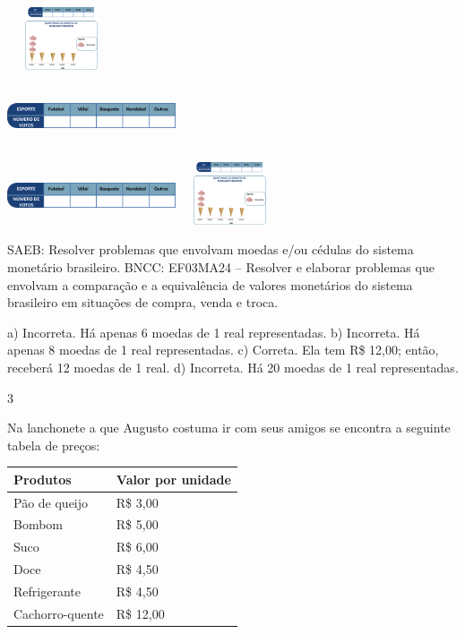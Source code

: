 \begin{escolha}
{\begin{escolha}
\begin{escolha}
\item
\includegraphics[width=1.26678in,height=0.72506in]{media/image84.png}

\item
\includegraphics[width=1.95850in,height=0.69173in]{media/image85.png}

\item
\includegraphics[width=1.95850in,height=0.69173in]{media/image85.png}\includegraphics[width=1.26678in,height=0.72506in]{media/image84.png}
\end{escolha}

SAEB: Resolver problemas que envolvam moedas e/ou cédulas do sistema monetário brasileiro. 
BNCC: EF03MA24 -- Resolver e elaborar problemas que envolvam a comparação e a equivalência de
valores monetários do sistema brasileiro em situações de compra, venda e troca.

a) Incorreta. Há apenas 6 moedas de 1 real representadas.
b) Incorreta. Há apenas 8 moedas de 1 real representadas.
c) Correta. Ela tem R\$ 12,00; então, receberá 12 moedas de 1 real.
d) Incorreta. Há 20 moedas de 1 real representadas.

\num{3}

Na lanchonete a que Augusto costuma ir com seus amigos se encontra a
seguinte tabela de preços:

\begin{longtable}[]{@{}ll@{}}
\toprule
Produtos & Valor por unidade\tabularnewline
\midrule
\endhead
Pão de queijo & R\$ 3,00\tabularnewline
Bombom & R\$ 5,00\tabularnewline
Suco & R\$ 6,00\tabularnewline
Doce & R\$ 4,50\tabularnewline
Refrigerante & R\$ 4,50\tabularnewline
Cachorro-quente & R\$ 12,00\tabularnewline
\bottomrule
\end{longtable}


\end{escolha}}
\end{escolha}
